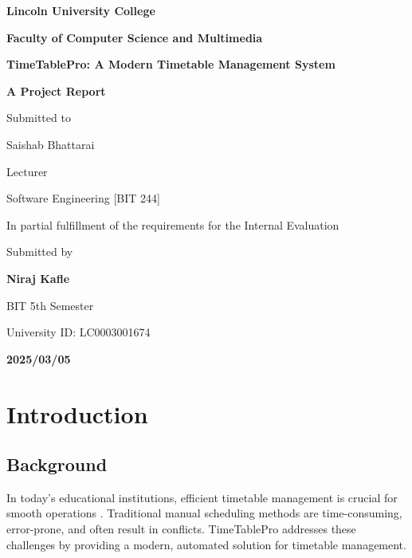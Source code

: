\documentclass[12pt,a4paper]{report}
\begin{document}
\begin{titlepage}
    \centering
    {\LARGE \textbf{Lincoln University College}\par}
    \vspace{0.2cm}
    {\Large \textbf{Faculty of Computer Science and Multimedia}\par}
    \vspace{0.5cm}
    {\LARGE \textbf{TimeTablePro: A Modern Timetable Management System}\par}
    \vspace{0.5cm}
    {\Large \textbf{A Project Report}\par}
    \vspace{0.3cm}
    {\large Submitted to\par}
    \vspace{0.3cm}
    {\Large Saishab Bhattarai\par}
    {\Large Lecturer\par}
    {\Large Software Engineering [BIT 244]\par}
    \vspace{0.3cm}
    {\large In partial fulfillment of the requirements for the Internal Evaluation \par}
    \vspace{0.3cm}
    {\large Submitted by\par}
    \vspace{0.2cm}
    {\Large \textbf{Niraj Kafle}\par}
    {\Large BIT 5th Semester\par}
    {\Large University ID: LC0003001674\par}
    \vspace{0.5cm}
    {\large \textbf{2025/03/05}\par}
\end{titlepage}
\clearpage

\tableofcontents
\clearpage

\chapter{Introduction}
\section{Background}
In today's educational institutions, efficient timetable management is crucial for smooth operations \cite{timetable_systems}. Traditional manual scheduling methods are time-consuming, error-prone, and often result in conflicts. TimeTablePro addresses these challenges by providing a modern, automated solution for timetable management.
\end{document}
